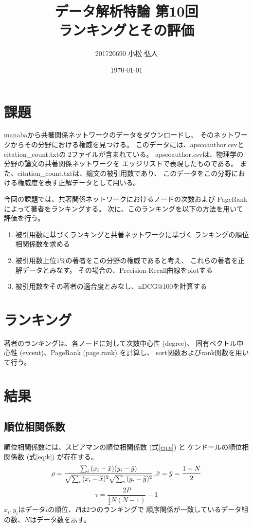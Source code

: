 \documentclass{jsarticle}
\title{データ解析特論 第10回\\ランキングとその評価}
\author{201720690 小松 弘人}
\date{\today}
\makeatletter
\def\maketitle{%
    \null
    \thispagestyle{empty}%
    \vfill
    \begin{center}\leavevmode
        \normalfont
        {\LARGE \@title\par}%
        \vskip 1cm
        {\Large \@author\par}%
        \vskip 1cm
        {\Large \@date\par}%
    \end{center}%
    \vfill
    \null
    \@thanks%
    \cleardoublepage
}
\makeatother
\begin{document}
\maketitle
\thispagestyle{empty}
\section{課題}

manabaから共著関係ネットワークのデータをダウンロードし、
そのネットワークからその分野における権威を見つける。
このデータには、apscoauthor.csvとcitation\_count.txtの
2ファイルが含まれている。
apscoauthor.csvは、物理学の分野の論文の共著関係ネットワークを
エッジリストで表現したものである。
また、citation\_count.txtは、論文の被引用数であり、
このデータをこの分野における権威度を表す正解データとして用いる。

今回の課題では、共著関係ネットワークにおけるノードの次数および
PageRankによって著者をランキングする。
次に、このランキングを以下の方法を用いて評価を行う。
\begin{enumerate}
    \item
        被引用数に基づくランキングと共著ネットワークに基づく
        ランキングの順位相関係数を求める
    \item
        被引用数上位$1\%$の著者をこの分野の権威であると考え、
        これらの著者を正解データとみなす。
        その場合の、Precision-Recall曲線をplotする
    \item
        被引用数をその著者の適合度とみなし、nDCG@100を計算する
\end{enumerate}

\section{ランキング}
著者のランキングは、各ノードに対して次数中心性 (degree)、
固有ベクトル中心性 (evcent)、PageRank (page.rank) を計算し、
sort関数およびrank関数を用いて行う。

\section{結果}
\subsection{順位相関係数}
順位相関係数には、スピアマンの順位相関係数 (式\ref{eq:s}) と
ケンドールの順位相関係数 (式\ref{eq:k}) が存在する。
\begin{equation}
    \rho = \frac{\sum_i{(x_i-\bar{x})(y_i-\bar{y})}}{\sqrt{\sum_i{(x_i-\bar{x})^2}}\sqrt{\sum_i{(y_i-\bar{y})^2}}}, \\
    \bar{x}=\bar{y}=\frac{1+N}{2}
    \label{eq:s}
\end{equation}
\begin{equation}
    \tau = \frac{2P}{\frac{1}{2}N(N-1)}-1
    \label{eq:k}
\end{equation}
$x_i, y_i$はデータ$i$の順位、$P$は2つのランキングで
順序関係が一致しているデータ組の数、$N$はデータ数を示す。
\end{document}
